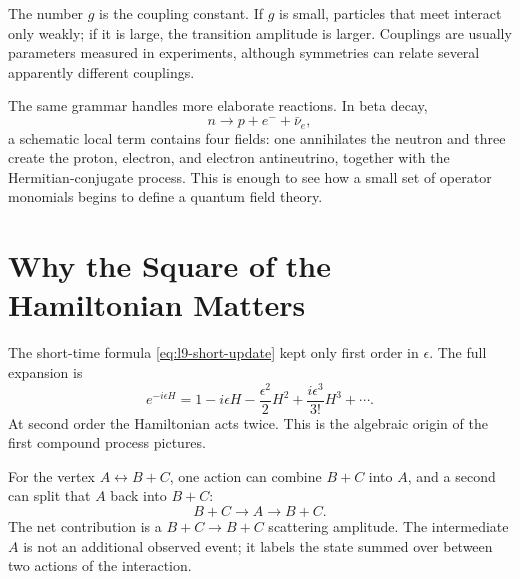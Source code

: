 The number \(g\) is the coupling constant. If \(g\) is small, particles that meet interact only weakly; if it is large, the transition amplitude is larger. Couplings are usually parameters measured in experiments, although symmetries can relate several apparently different couplings.

The same grammar handles more elaborate reactions. In beta decay,
\begin{equation}
n\longrightarrow p+e^-+\bar\nu_e,
\end{equation}
a schematic local term contains four fields: one annihilates the neutron and three create the proton, electron, and electron antineutrino, together with the Hermitian-conjugate process. This is enough to see how a small set of operator monomials begins to define a quantum field theory.

\section{Why the Square of the Hamiltonian Matters}

The short-time formula \eqref{eq:l9-short-update} kept only first order in \(\epsilon\). The full expansion is
\begin{equation}
e^{-i\epsilon H}
=1-i\epsilon H-\frac{\epsilon^2}{2}H^2
+\frac{i\epsilon^3}{3!}H^3+\cdots.
\label{eq:l9-exponential}
\end{equation}
At second order the Hamiltonian acts twice. This is the algebraic origin of the first compound process pictures.

For the vertex \(A\leftrightarrow B+C\), one action can combine \(B+C\) into \(A\), and a second can split that \(A\) back into \(B+C\):
\begin{equation}
B+C\longrightarrow A\longrightarrow B+C.
\label{eq:l9-bc-scattering}
\end{equation}
The net contribution is a \(B+C\to B+C\) scattering amplitude. The intermediate \(A\) is not an additional observed event; it labels the state summed over between two actions of the interaction.

\begin{classroomqa}
\end{classroomqa}

